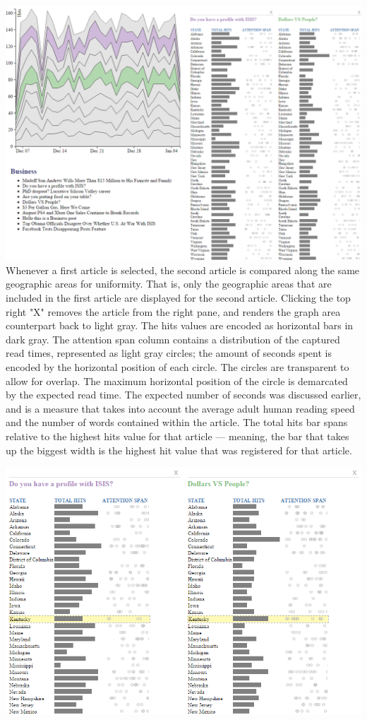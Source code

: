 \documentclass[12pt]{article}
\begin{document}
{\noindent\includegraphics[scale=0.5]{img/viz_8} \\

Whenever a first article is selected, the second article is compared along the same geographic areas for uniformity. That is, only the geographic areas that are included in the first article are displayed for the second article. Clicking the top right "X" removes the article from the right pane, and renders the graph area counterpart back to light gray. 
The hits values are encoded as horizontal bars in dark gray. The attention span column contains a distribution of the captured read times, represented as light gray circles; the amount of seconds spent is encoded by the horizontal position of each circle. The circles are transparent to allow for overlap. The maximum horizontal position of the circle is demarcated by the expected read time. The expected number of seconds was discussed earlier, and is a measure that takes into account the average adult human reading speed and the number of words contained within the article. The total hits bar spans relative to the highest hits value for that article --- meaning, the bar that takes up the biggest width is the highest hit value that was registered for that article. 

\vfill

\noindent\includegraphics[scale=0.8]{img/viz_9} \\

}
\end{document}
